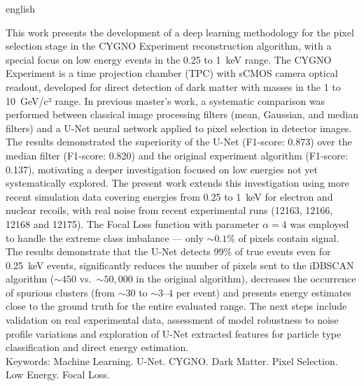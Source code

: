 \documentclass[
       oneside,
       english,
       brazil
       ]{abntbibufjf}
\begin{document}
\begin{resumo}[ABSTRACT]
\begin{otherlanguage*}{english}

This work presents the development of a deep learning methodology for the
pixel selection stage in the CYGNO Experiment reconstruction algorithm, with
a special focus on low energy events in the 0.25 to 1~keV range. The CYGNO
Experiment is a time projection chamber (TPC) with sCMOS camera optical
readout, developed for direct detection of dark matter with masses in the
1 to 10~GeV/c² range. In previous master's work, a systematic comparison was
performed between classical image processing filters (mean, Gaussian, and
median filters) and a U-Net neural network applied to pixel selection in
detector images. The results demonstrated the superiority of the U-Net
(F1-score: 0.873) over the median filter (F1-score: 0.820) and the original
experiment algorithm (F1-score: 0.137), motivating a deeper investigation
focused on low energies not yet systematically explored. The present work
extends this investigation using more recent simulation data covering energies
from 0.25 to 1~keV for electron and nuclear recoils, with real noise from
recent experimental runs (12163, 12166, 12168 and 12175). The Focal Loss
function with parameter $\alpha = 4$ was employed to handle the extreme class
imbalance — only ${\sim}0.1\%$ of pixels contain signal. The results
demonstrate that the U-Net detects 99\% of true events even for 0.25~keV
events, significantly reduces the number of pixels sent to the iDBSCAN
algorithm (${\sim}450$ vs.\ ${\sim}50{,}000$ in the original algorithm),
decreases the occurrence of spurious clusters (from ${\sim}30$ to
${\sim}3$--$4$ per event) and presents energy estimates close to the ground
truth for the entire evaluated range. The next steps include validation on
real experimental data, assessment of model robustness to noise profile
variations and exploration of U-Net extracted features for particle type
classification and direct energy estimation.\\[18pt]
Keywords: Machine Learning. U-Net. CYGNO. Dark Matter. Pixel Selection.
Low Energy. Focal Loss.
\end{otherlanguage*}
\end{resumo}


\ilustvaria
\listilustvaria

\cleardoublepage
{}
\listoftables*

\cleardoublepage
\end{document}
